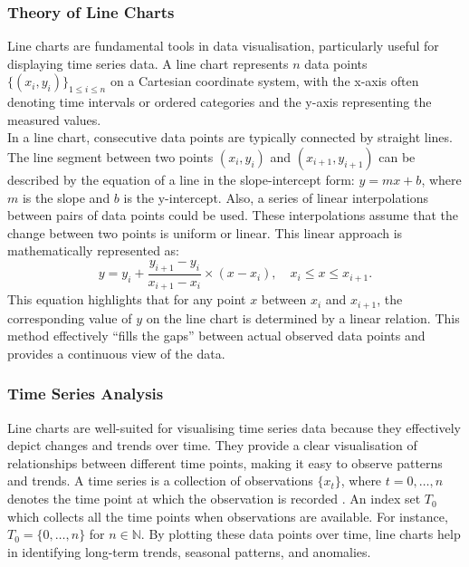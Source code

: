 \documentclass{article}\usepackage[]{graphicx}\usepackage[]{xcolor}
\numberwithin{equation}{section}
\begin{document}
\subsubsection{Theory of Line Charts}

Line charts are fundamental tools in data visualisation, particularly useful for displaying time series data. A line chart represents $n$ data points 
$\{(x_i,y_i)\}_{1 \leq i \leq n}$ on a Cartesian coordinate system, with the x-axis often denoting time intervals or ordered categories and the y-axis representing the measured values.\\ 

\noindent
In a line chart, consecutive data points are typically connected by straight lines. The line segment between two points \((x_i,y_i)\) and \((x_{i+1},y_{i+1})\) can be described by the equation of a line in the slope-intercept form: \(y=mx+b\), where \(m\) is the slope and \(b\) is the y-intercept. Also, a series of linear interpolations between pairs of data points could be used. These interpolations assume that the change between two points is uniform or linear. This linear approach is mathematically represented as:
\[
y = y_i + \frac{y_{i+1} - y_i}{x_{i+1} - x_i} \times (x - x_i), \quad  x_i \leq x \leq x_{i+1}.
\]
\noindent
This equation highlights that for any point \(x\) between \(x_i\) and \(x_{i+1}\), the corresponding value of \(y\) on the line chart is determined by a linear relation. This method effectively ``fills the gaps'' between actual observed data points and provides a continuous view of the data.

\subsubsection{Time Series Analysis}

Line charts are well-suited for visualising time series data because they effectively depict changes and trends over time. They provide a clear visualisation of relationships between different time points, making it easy to observe patterns and trends. A time series is a collection of observations $\{x_t\}$, where $t=0,\dots,n$ denotes the time point at which the observation is recorded \cite{Brockwell2016Introduction}. An index set $T_0$ which collects all the time points when observations are available. For instance, $T_0 = \{0,\dots,n\}$ for $n \in \mathbb{N}$. By plotting these data points over time, line charts help in identifying long-term trends, seasonal patterns, and anomalies.\\
\end{document}
